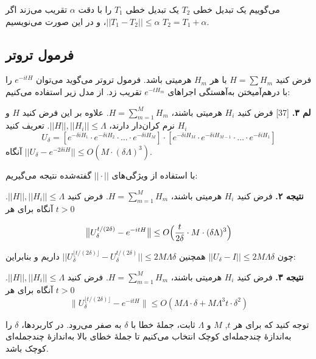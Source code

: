 \begin{defn}
 می‌گوییم یک تبدیل خطی $T_2$ یک تبدیل خطی $T_1$ را با دقت $\alpha$ تقریب می‌زند اگر $||T_1 - T_2|| \le \alpha$، و در این صورت می‌نویسیم $T_2 = T_1 + \alpha$.
\end{defn}

\subsection{ فرمول تروتر}
فرض کنید $H = \sum H_m$ با هر $H_m$ هرمیتی باشد. فرمول تروتر می‌گوید می‌توان $e^{-itH}$ را با درهم‌آمیختن به‌آهستگی اجراهای $e^{-t H_m}$ تقریب زد. از مدل زیر استفاده می‌کنیم:

\textbf{لم ۳.} [37] فرض کنید $H_i$ هرمیتی باشند، $H = \sum_{m=1}^M H_m$. علاوه بر این فرض کنید $H$ و $H_i$ نرم کران‌دار دارند، $||H||, ||H_i|| \le \Lambda$. تعریف کنید
\[
U_\delta = [ e^{-\delta i H_1} \cdot e^{-\delta i H_2} \cdot \ldots \cdot e^{-\delta i H_M} ] \cdot [ e^{-\delta i H_M} \cdot e^{-\delta i H_{M-1}} \cdot \ldots \cdot e^{-\delta i H_1} ]
\]
آنگاه $||U_\delta - e^{-2\delta i H}|| \le O(M \cdot (\delta \Lambda)^3)$.

با استفاده از ویژگی‌های $||\cdot||$ گفته‌شده نتیجه می‌گیریم:

\textbf{نتیجه ۲.} فرض کنید $H_i$ هرمیتی باشند، $H = \sum_{m=1}^M H_m$. فرض کنید $||H||, ||H_i|| \le \Lambda$. آنگاه برای هر $t > 0$

\begin{equation}
	\bigl\| U_\delta^{t/(2\delta)} - e^{-itH} \bigr\| \le O\Bigl( \frac{t}{2\delta} \cdot M \cdot (\delta \Lambda)^3 \Bigr)
\end{equation}

چون $||U_\delta - I|| \le 2M\Lambda\delta$ همچنین $||U_\delta^{\lfloor t/(2\delta) \rfloor} - U_\delta^{t/(2\delta)}|| \le 2M\Lambda\delta$ داریم و بنابراین:

\textbf{نتیجه ۳.} فرض کنید $H_i$ هرمیتی باشند، $H = \sum_{m=1}^M H_m$. فرض کنید $||H||, ||H_i|| \le \Lambda$. آنگاه برای هر $t > 0$
\begin{equation}
	\bigl\| U_\delta^{\lfloor t/(2\delta) \rfloor} - e^{-itH} \bigr\| \le O(M\Lambda \cdot \delta + M\Lambda^3 t \cdot \delta^2)
\end{equation}

توجه کنید که برای هر $t$, $M$ و $\Lambda$ ثابت، جملهٔ خطا با $\delta$ به صفر می‌رود. در کاربردها، $\delta$ را به‌اندازهٔ چندجمله‌ای کوچک انتخاب می‌کنیم تا جملهٔ خطای بالا به‌اندازهٔ چندجمله‌ای کوچک باشد.

